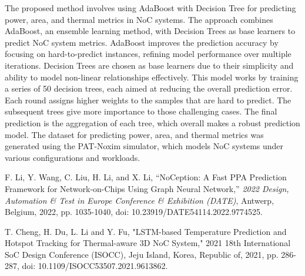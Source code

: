 \documentclass[conference]{IEEEtran}
\begin{document}
The proposed method involves using AdaBoost with Decision Tree for predicting power, area, and thermal metrics in NoC systems. The approach combines AdaBoost, an ensemble learning method, with Decision Trees as base learners to predict NoC system metrics. AdaBoost improves the prediction accuracy by focusing on hard-to-predict instances, refining model performance over multiple iterations. Decision Trees are chosen as base learners due to their simplicity and ability to model non-linear relationships effectively. This model works by training a series of 50 decision trees, each aimed at reducing the overall prediction error. Each round assigns higher weights to the samples that are hard to predict. The subsequent trees give more importance to those challenging cases. The final prediction is the aggregation of each tree, which overall makes a robust prediction model. The dataset for predicting power, area, and thermal metrics was generated using the PAT-Noxim simulator, which models NoC systems under various configurations and workloads.
\begin{thebibliography}{00}

F. Li, Y. Wang, C. Liu, H. Li, and X. Li, ``NoCeption: A Fast PPA Prediction Framework for Network-on-Chips Using Graph Neural Network,'' \emph{2022 Design, Automation \& Test in Europe Conference \& Exhibition (DATE)}, Antwerp, Belgium, 2022, pp. 1035-1040, doi: 10.23919/DATE54114.2022.9774525.

T. Cheng, H. Du, L. Li and Y. Fu, "LSTM-based Temperature Prediction and Hotspot Tracking for Thermal-aware 3D NoC System," 2021 18th International SoC Design Conference (ISOCC), Jeju Island, Korea, Republic of, 2021, pp. 286-287, doi: 10.1109/ISOCC53507.2021.9613862.

\end{thebibliography}
\end{document}
